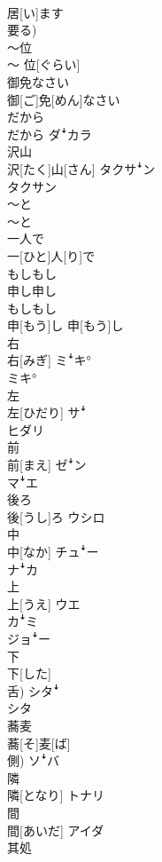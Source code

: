 \documentclass[8pt]{extreport}
\begin{document}
\begin{CJK}{UTF8}{min}
\\	居[い]ます 
\\	要る)	
\\	〜位	
\\	〜 位[ぐらい]	
\\	御免なさい	
\\	御[ご]免[めん]なさい	
\\	だから	
\\	だから	ダꜜカラ
\\	沢山	
\\	沢[たく]山[さん]	タクサꜜン 
\\	タクサン
\\	〜と	
\\	〜と	
\\	一人で	
\\	一[ひと]人[り]で	
\\	もしもし 
\\	申し申し	
\\	もしもし 
\\	申[もう]し 申[もう]し	
\\	右	
\\	右[みぎ]	ミꜜキ° 
\\	ミキ°
\\	左	
\\	左[ひだり]	サꜜ 
\\	ヒダリ
\\	前	
\\	前[まえ]	ゼꜜン 
\\	マꜜエ
\\	後ろ	
\\	後[うし]ろ	ウシロ
\\	中	
\\	中[なか]	チュꜜー 
\\	ナꜜカ
\\	上	
\\	上[うえ]	ウエ 
\\	カꜜミ 
\\	ジョꜜー
\\	下	
\\	下[した] 
\\	舌)	シタꜜ 
\\	シタ
\\	蕎麦	
\\	蕎[そ]麦[ば] 
\\	側)	ソꜜバ
\\	隣	
\\	隣[となり]	トナリ
\\	間	
\\	間[あいだ]	アイダ
\\	其処	

\end{CJK}
\end{document}
